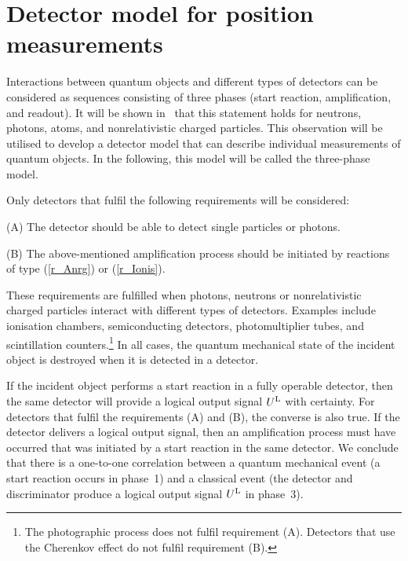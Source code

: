 \documentclass[12pt]{article}
\begin{document}

\section{Detector model for position measurements}\label{ch_det-mod} 

Interactions between quantum objects and different types of detectors can be considered as sequences consisting of three phases (start reaction, amplification, and readout).  It will be shown in~\cite{Wick} that this statement holds for neutrons, photons, atoms, and nonrelativistic charged particles.  
This observation will be utilised to develop a detector model that can describe individual measurements of quantum objects.  
In the following, this model will be called the three-phase model.  

Only detectors that fulfil the following requirements will be considered:  

(A) The detector should be able to detect single particles or photons.  

(B) The above-mentioned amplification process should be initiated by reactions of type (\ref{r_Anrg}) or (\ref{r_Ionis}).  

These requirements are fulfilled when photons, neutrons or nonrelativistic charged particles interact with different types of detectors.  
Examples include ionisation chambers, semiconducting detectors, photomultiplier tubes, and scintillation counters.\footnote{The photographic process does not fulfil requirement (A).  Detectors that use the Cherenkov effect do not fulfil requirement (B).} In all cases, the quantum mechanical state of the incident object is destroyed when it is detected in a detector.  

If the incident object performs a start reaction in a fully operable detector, then the same detector will provide a logical output signal $U^{\rm L}$ with certainty. For detectors that fulfil the requirements (A) and (B), the converse is also true.  
If the detector delivers a logical output signal, then an amplification process must have occurred that was initiated by a start reaction in the same detector.  
We conclude that there is a one-to-one correlation between a quantum mechanical event (a start reaction occurs in phase~1) and a classical event (the detector and discriminator produce a logical output signal $U^{\rm L}$ in phase~3).  
\end{document}
